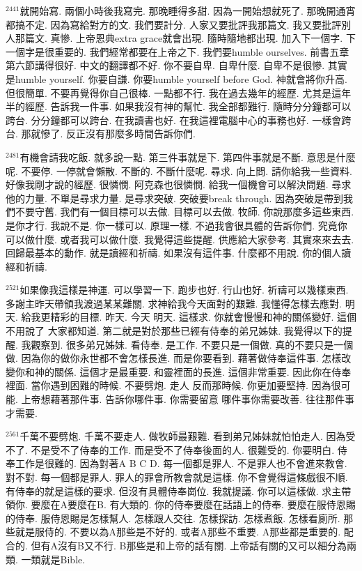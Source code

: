 \documentclass{book}
\begin{document}
$^{2441}$就開始寫.
兩個小時後我寫完.
那晚睡得多甜.
因為一開始想就死了.
那晚開通宵都搞不定.
因為寫給對方的文.
我們要計分.
人家又要批評我那篇文.
我又要批評別人那篇文.
真慘.
上帝恩典extra grace就會出現.
隨時隨地都出現.
加入下一個字.
下一個字是很重要的.
我們經常都要在上帝之下.
我們要humble ourselves.
前書五章第六節講得很好.
中文的翻譯都不好.
你不要自卑.
自卑什麼.
自卑不是很慘.
其實是humble yourself.
你要自謙.
你要humble yourself before God.
神就會將你升高.
但很簡單.
不要再覺得你自己很棒.
一點都不行.
我在過去幾年的經歷.
尤其是這年半的經歷.
告訴我一件事.
如果我沒有神的幫忙.
我全部都難行.
隨時分分鐘都可以跨台.
分分鐘都可以跨台.
在我讀書也好.
在我這裡電腦中心的事務也好.
一樣會跨台.
那就慘了.
反正沒有那麼多時間告訴你們.

$^{2481}$有機會請我吃飯.
就多說一點.
第三件事就是下.
第四件事就是不斷.
意思是什麼呢.
不要停.
一停就會懶散.
不斷的.
不斷什麼呢.
尋求.
向上問.
請你給我一些資料.
好像我剛才說的經歷.
很憐憫.
阿克森也很憐憫.
給我一個機會可以解決問題.
尋求他的力量.
不單是尋求力量.
是尋求突破.
突破要break through.
因為突破是帶到我們不要守舊.
我們有一個目標可以去做.
目標可以去做.
牧師.
你說那麼多這些東西.
是你才行.
我說不是.
你一樣可以.
原理一樣.
不過我會很具體的告訴你們.
究竟你可以做什麼.
或者我可以做什麼.
我覺得這些提醒.
供應給大家參考.
其實來來去去.
回歸最基本的動作.
就是讀經和祈禱.
如果沒有這件事.
什麼都不用說.
你的個人讀經和祈禱.

$^{2521}$如果像我這樣是神運.
可以學習一下.
跑步也好.
行山也好.
祈禱可以幾樣東西.
多謝主昨天帶領我渡過某某難關.
求神給我今天面對的艱難.
我懂得怎樣去應對.
明天.
給我更精彩的目標.
昨天.
今天 明天.
這樣求.
你就會慢慢和神的關係變好.
這個不用說了 大家都知道.
第二就是對於那些已經有侍奉的弟兄姊妹.
我覺得以下的提醒.
我觀察到.
很多弟兄姊妹.
看侍奉.
是工作.
不要只是一個做.
真的不要只是一個做.
因為你的做你永世都不會怎樣長進.
而是你要看到.
藉著做侍奉這件事.
怎樣改變你和神的關係.
這個才是最重要.
和靈裡面的長進.
這個非常重要.
因此你在侍奉裡面.
當你遇到困難的時候.
不要劈炮.
走人 反而那時候.
你更加要堅持.
因為很可能.
上帝想藉著那件事.
告訴你哪件事.
你需要留意 哪件事你需要改善.
往往那件事才需要.

$^{2561}$千萬不要劈炮.
千萬不要走人.
做牧師最艱難.
看到弟兄姊妹就怕怕走人.
因為受不了.
不是受不了侍奉的工作.
而是受不了侍奉後面的人.
很難受的.
你要明白.
侍奉工作是很難的.
因為對著A B C D.
每一個都是罪人.
不是罪人也不會進來教會.
對不對.
每一個都是罪人.
罪人的罪會所教會就是這樣.
你不會覺得這條戲很不順.
有侍奉的就是這樣的要求.
但沒有具體侍奉崗位.
我就提議.
你可以這樣做.
求主帶領你.
要麼在A要麼在B.
有大類的.
你的侍奉要麼在話語上的侍奉.
要麼在服侍恩賜的侍奉.
服侍恩賜是怎樣幫人.
怎樣跟人交往.
怎樣探訪.
怎樣煮飯.
怎樣看廁所.
那些就是服侍的.
不要以為A那些是不好的.
或者A那些不重要.
A那些都是重要的.
配合的.
但有A沒有B又不行.
B那些是和上帝的話有關.
上帝話有關的又可以細分為兩類.
一類就是Bible.
\end{document}

